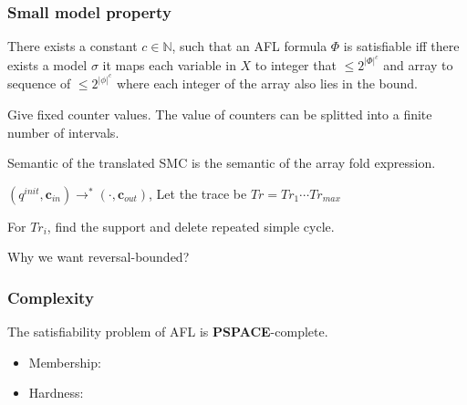 \documentclass[11pt]{beamer}
\begin{document}
\begin{frame}\frametitle{Small model property}
\begin{lemma}
There exists a constant $c\in \mathbb{N}$, such that an AFL formula $\Phi$ is satisfiable iff there exists a model $\sigma$ it maps each variable in $X$ to integer that $\le 2^{|\Phi|^c}$ and array to sequence of $\le 2^{|\phi|^c}$ where each integer of the array also lies in the bound.
\end{lemma}

Give fixed counter values. The value of counters can be splitted into a finite number of intervals.

Semantic of the translated SMC is the semantic of the array fold expression.

$(q^{init}, \mathbf{c}_{in}) \rightarrow^* (\cdot, \mathbf{c}_{out})$, Let the trace be $Tr = Tr_1\cdots Tr_{max}$

For $Tr_i$, find the support and delete repeated simple cycle.

Why we want reversal-bounded?


\end{frame}

\begin{frame}\frametitle{Complexity}


\begin{theorem}
The satisfiability problem of AFL is \textbf{PSPACE}-complete.

\end{theorem}
\begin{itemize}
\item Membership:





\item Hardness:
\end{itemize}

\end{frame}
\end{document}
